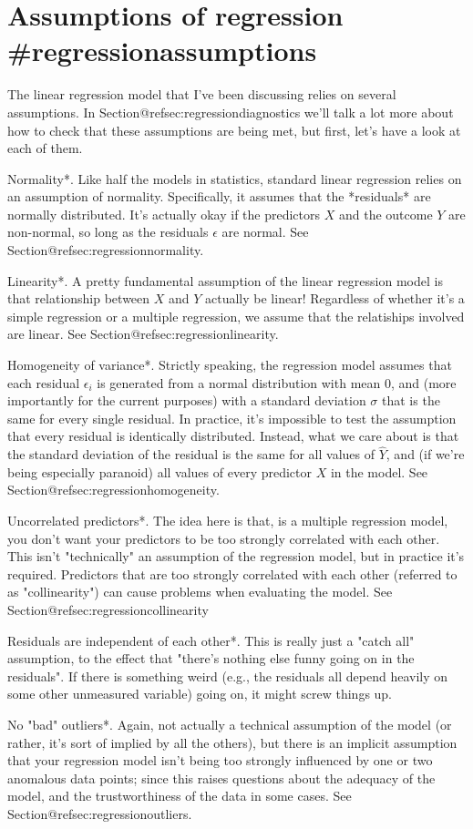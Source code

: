 \section{Assumptions of regression {#regressionassumptions}}

The linear regression model that I've been discussing relies on several assumptions. In Section@refsec:regressiondiagnostics we'll talk a lot more about how to check that these assumptions are being met, but first, let's have a look at each of them.


\item *Normality*. Like half the models in statistics, standard linear regression relies on an assumption of normality. Specifically, it assumes that the *residuals* are normally distributed. It's actually okay if the predictors $X$ and the outcome $Y$ are non-normal, so long as the residuals $\epsilon$ are normal. See Section@refsec:regressionnormality.
\item *Linearity*. A pretty fundamental assumption of the linear regression model is that relationship between $X$ and $Y$ actually be linear! Regardless of whether it's a simple regression or a multiple regression, we assume that the relatiships involved are linear. See Section@refsec:regressionlinearity.
\item *Homogeneity of variance*. Strictly speaking, the regression model assumes that each residual $\epsilon_i$ is generated from a normal distribution with mean 0, and (more importantly for the current purposes) with a standard deviation $\sigma$ that is the same for every single residual. In practice, it's impossible to test the assumption that every residual is identically distributed. Instead, what we care about is that the standard deviation of the residual is the same for all values of $\hat{Y}$, and (if we're being especially paranoid) all values of every predictor $X$ in the model. See Section@refsec:regressionhomogeneity.
\item *Uncorrelated predictors*. The idea here is that, is a multiple regression model, you don't want your predictors to be too strongly correlated with each other. This isn't  "technically" an assumption of the regression model, but in practice it's required. Predictors that are too strongly correlated with each other (referred to as "collinearity") can cause problems when evaluating the model. See Section@refsec:regressioncollinearity
\item *Residuals are independent of each other*. This is really just a "catch all" assumption, to the effect that "there's nothing else funny going on in the residuals". If there is something weird (e.g., the residuals all depend heavily on some other unmeasured variable) going on, it might screw things up.
\item *No "bad" outliers*. Again, not actually a technical assumption of the model (or rather, it's sort of implied by all the others), but there is an implicit assumption that your regression model isn't being too strongly influenced by one or two anomalous data points; since this raises questions about the adequacy of the model, and the trustworthiness of the data in some cases. See Section@refsec:regressionoutliers.


